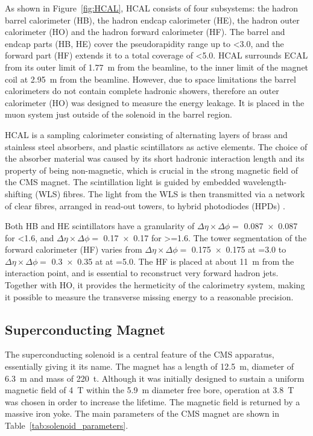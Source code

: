 As shown in Figure~\ref{fig:HCAL}, HCAL consists of four subsystems: the hadron barrel calorimeter (HB), the hadron
endcap calorimeter (HE), the hadron outer calorimeter (HO) and the hadron forward calorimeter (HF). The barrel and
endcap parts (HB, HE) cover the pseudorapidity range up to \abs\eta \num{<3.0}, and the forward part (HF) extends it to
a total coverage of \abs\eta \num{<5.0}. HCAL surrounds ECAL from its outer limit of \SI{1.77}{\metre} from the
beamline, to the inner limit of the magnet coil at \SI{2.95}{\metre} from the beamline. However, due to space
limitations the barrel calorimeters do not contain complete hadronic showers, therefore an outer calorimeter (HO) was
designed to measure the energy leakage. It is placed in the muon system just outside of the solenoid in the barrel
region.

HCAL is a sampling calorimeter consisting of alternating layers of brass and stainless steel absorbers, and plastic
scintillators as active elements. The choice of the absorber material was caused by its short hadronic interaction
length and its property of being non-magnetic, which is crucial in the strong magnetic field of the CMS magnet. The
scintillation light is guided by embedded wavelength-shifting (WLS) fibres. The light from the WLS is then transmitted
via a network of clear fibres, arranged in read-out towers, to hybrid photodiodes (HPDs) \autocite{CMS}.

Both HB and HE scintillators have a granularity of $\Delta \eta \times \Delta \phi =$ \num{0.087x0.087} for \abs\eta
\num{<1.6}, and $\Delta \eta \times \Delta \phi =$ \num{0.17x0.17} for \abs\eta \num{>=1.6}. The tower segmentation of
the forward calorimeter (HF) varies from $\Delta \eta \times \Delta \phi =$ \num{0.175x0.175} at \abs\eta \num{=3.0} to
$\Delta \eta \times \Delta \phi =$ \num{0.3x0.35} at at \abs\eta \num{=5.0}. The HF is placed at about \SI{11}{\metre}
from the interaction point, and is essential to reconstruct very forward hadron jets. Together with HO, it provides the
hermeticity of the calorimetry system, making it possible to measure the transverse missing energy to a reasonable
precision.


\subsection{Superconducting Magnet}
The superconducting solenoid is a central feature of the CMS apparatus, essentially giving it its name. The magnet
has a length of \SI{12.5}{\metre}, diameter of \SI{6.3}{\metre} and mass of \SI{220}{\tonne}. Although it was initially
designed to sustain a uniform magnetic field of \SI{4}{\tesla} within the \SI{5.9}{\metre} diameter free bore, operation
at \SI{3.8}{\tesla} was chosen in order to increase the lifetime. The magnetic field is returned by a massive iron yoke.
The main parameters of the CMS magnet are shown in Table~\ref{tab:solenoid_parameters}.

